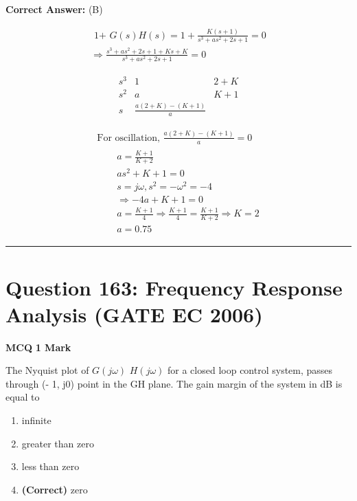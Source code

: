 \documentclass[11pt,a4paper]{article}
\begin{document}
\noindent \textbf{Correct Answer:} (B)

\begin{tcolorbox}[solbox, title=Detailed Solution -- Question 162]
\[
\begin{array}{l} \text { 1+ } G(s) H(s)=1+\frac{K(s+1)}{s^{3}+a s^{2}+2 s+1}=0 \\ \Rightarrow \frac{s^{3}+a s^{2}+2 s+1+K s+K}{s^{3}+a s^{2}+2 s+1}=0 \end{array}
\]

\[
\begin{array}{c|cc} s^{3}& 1 &2+K\\ s^{2}&a & K+1\\ s&\frac{a(2+K)-(K+1)}{a} \end{array}
\]

\[
\begin{array}{l} \text { For oscillation, } \frac{a(2+K)-(K+1)}{a}=0 \\ \qquad \begin{array}{l} a=\frac{K+1}{K+2} \\ a s^{2}+K+1=0 \\ s=j \omega, s^{2}=-\omega^{2}=-4 \\ \Rightarrow-4 a+K+1=0 \\ a=\frac{K+1}{4} \Rightarrow \frac{K+1}{4}=\frac{K+1}{K+2} \Rightarrow K=2 \\ a=0.75 \end{array} \end{array}
\]
\end{tcolorbox}

\vspace{1.5em}
\hrule
\vspace{1.5em}

\section*{Question 163: Frequency Response Analysis (GATE EC 2006)}
\noindent \textbf{\color{primary}MCQ} \hfill \textbf{\color{secondary}1 Mark}


\noindent The Nyquist plot of $G(j\omega )$ $H(j\omega )$ for a closed loop control system, passes through
(- 1, j0) point in the GH plane. The gain margin of the system in dB is equal to


\begin{enumerate}[label=(\Alph*)]
    \item infinite
    \item greater than zero
    \item less than zero
    \item \textbf{(Correct)} zero
\end{enumerate}
\end{document}
